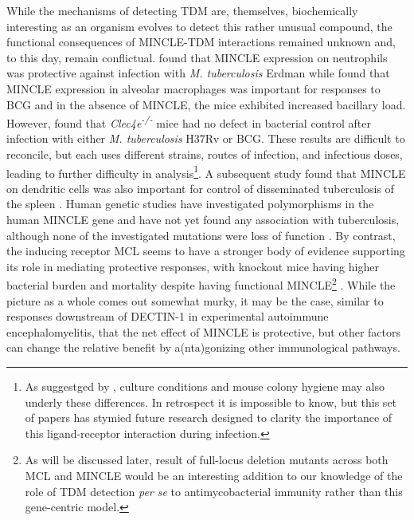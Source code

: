 While the mechanisms of detecting TDM are, themselves, biochemically interesting as an organism evolves to detect this rather unusual compound, the functional consequences of MINCLE\hyp{}TDM interactions remained unknown and, to this day, remain conflictual. \citet{Lee2012} found that MINCLE expression on neutrophils was protective against infection with \textit{M. tuberculosis} Erdman while \citet{Behler2012} found that MINCLE expression in alveolar macrophages was important for responses to BCG and in the absence of MINCLE, the mice exhibited increased bacillary load. However, \citet{Heitmann2013} found that \textit{Clec4e\textsuperscript{\hyp{}/\hyp{}}} mice had no defect in bacterial control after infection with either \textit{M. tuberculosis} H37Rv or BCG. These results are difficult to reconcile, but each uses different strains, routes of infection, and infectious doses, leading to further difficulty in analysis\footnote{As suggestged by \citet{Lang2013}, culture conditions and mouse colony hygiene may also underly these differences. In retrospect it is impossible to know, but this set of papers has stymied future research designed to clarity the importance of this ligand\hyp{}receptor interaction during infection.}. A subsequent study found that MINCLE on dendritic cells was also important for control of disseminated tuberculosis of the spleen \citep{Behler2015}. Human genetic studies have investigated polymorphisms in the human MINCLE gene and have not yet found any association with tuberculosis, although none of the investigated mutations were loss of function \citep{Bowker2016}. By contrast, the inducing receptor MCL seems to have a stronger body of evidence supporting its role in mediating protective responses, with knockout mice having higher bacterial burden and mortality despite having functional MINCLE\footnote{As will be discussed later, result of full\hyp{}locus deletion mutants across both MCL and MINCLE would be an interesting addition to our knowledge of the role of TDM detection \textit{per se} to antimycobacterial immunity rather than this gene\hyp{}centric model.} \citep{Wilson2015}. While the picture as a whole comes out somewhat murky, it may be the case, similar to responses downstream of DECTIN\hyp{}1 in experimental autoimmune encephalomyelitis, that the net effect of MINCLE is protective, but other factors can change the relative benefit by a(nta)gonizing other immunological pathways.

